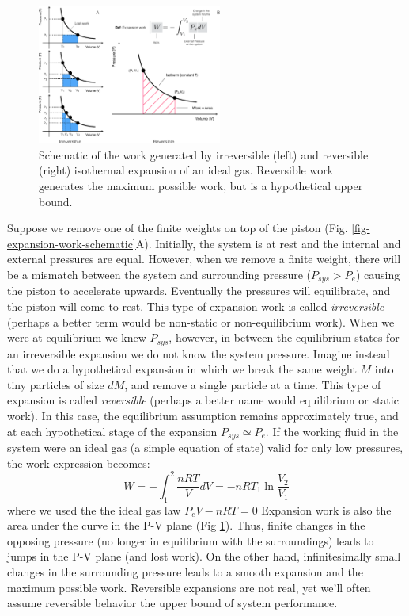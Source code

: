 \documentclass[11pt]{article}
\theoremstyle{definition}
\begin{document}
\begin{figure}
\includegraphics[width=0.54\textwidth]{./figs/WorkArea.pdf}
\caption{Schematic of the work generated by irreversible (left) and reversible (right) isothermal expansion of an ideal gas.
Reversible work generates the maximum possible work, but is a hypothetical upper bound.}\label{fig-expansion-work-area}
\end{figure}

Suppose we remove one of the finite weights on top of the piston (Fig. \ref{fig-expansion-work-schematic}A).
Initially, the system is at rest and the internal and external pressures are equal.
However, when we remove a finite weight, there will be a mismatch between the system and surrounding pressure ($P_{sys}>P_{e}$)
causing the piston to accelerate upwards. Eventually the pressures will equilibrate, and the piston will come to rest.
This type of expansion work is called \textit{irreversible} (perhaps a better term would be non-static or non-equilibrium work).
When we were at equilibrium we knew $P_{sys}$, however, in between the equilibrium states for an irreversible expansion we do not know the system pressure.
Imagine instead that we do a hypothetical expansion in which we break the same weight $M$ into tiny particles of size $dM$, and remove a single particle at a time.
This type of expansion is called \textit{reversible} (perhaps a better name would equilibrium or static work).
In this case, the equilibrium assumption remains approximately true, and at each hypothetical stage of the expansion $P_{sys}\simeq P_{e}$.
If the working fluid in the system were an ideal gas (a simple equation of state) valid for only low pressures, the work expression becomes:
\begin{equation}\label{eqn:isothermal-reversible-expansion}
W = - \int_{1}^{2} \frac{nRT}{V}dV = - nRT_{1}\ln\frac{V_{2}}{V_{1}}
\end{equation}where we used the the ideal gas law $P_{e}V - nRT = 0$
Expansion work is also the area under the curve in the P-V plane (Fig \ref{fig-expansion-work-area}).
Thus, finite changes in the opposing pressure (no longer in equilibrium with the surroundings) leads to jumps in the P-V plane (and lost work).
On the other hand, infinitesimally small changes in the surrounding pressure leads to a smooth expansion and the maximum possible work.
Reversible expansions are not real, yet we'll often assume reversible behavior the upper bound of system performance.
\end{document}

